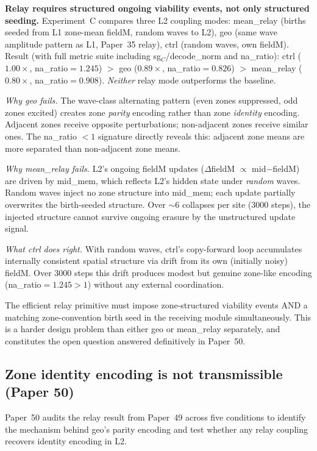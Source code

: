 \documentclass[11pt]{article}
\begin{document}
\textbf{Relay requires structured ongoing viability events, not only structured seeding.}
Experiment~C compares three L2 coupling modes:
mean\_relay (births seeded from L1 zone-mean fieldM, random waves to L2),
geo (same wave amplitude pattern as L1, Paper~35 relay),
ctrl (random waves, own fieldM).
Result (with full metric suite including sg$_C$/decode\_norm and na\_ratio):
ctrl ($1.00\times$, na\_ratio$=1.245$) $>$ geo ($0.89\times$, na\_ratio$=0.826$)
$>$ mean\_relay ($0.80\times$, na\_ratio$=0.908$).
\emph{Neither} relay mode outperforms the baseline.

\textit{Why geo fails.}
The wave-class alternating pattern (even zones suppressed, odd zones excited)
creates zone \emph{parity} encoding rather than zone \emph{identity} encoding.
Adjacent zones receive opposite perturbations; non-adjacent zones receive similar ones.
The na\_ratio $<1$ signature directly reveals this: adjacent zone means are
more separated than non-adjacent zone means.

\textit{Why mean\_relay fails.}
L2's ongoing fieldM updates ($\Delta$fieldM $\propto$ mid$-$fieldM) are driven by
mid\_mem, which reflects L2's hidden state under \emph{random} waves.
Random waves inject no zone structure into mid\_mem; each update partially
overwrites the birth-seeded structure.
Over $\sim 6$ collapses per site (3000 steps), the injected structure cannot
survive ongoing erasure by the unstructured update signal.

\textit{What ctrl does right.}
With random waves, ctrl's copy-forward loop accumulates internally consistent
spatial structure via drift from its own (initially noisy) fieldM.
Over 3000 steps this drift produces modest but genuine zone-like encoding
(na\_ratio$=1.245 > 1$) without any external coordination.

The efficient relay primitive must impose zone-structured viability events AND
a matching zone-convention birth seed in the receiving module simultaneously.
This is a harder design problem than either geo or mean\_relay separately,
and constitutes the open question answered definitively in Paper~50.

\subsection{Zone identity encoding is not transmissible (Paper 50)}

Paper~50 audits the relay result from Paper~49 across five conditions
to identify the mechanism behind geo's parity encoding and test whether
any relay coupling recovers identity encoding in L2.
\end{document}
